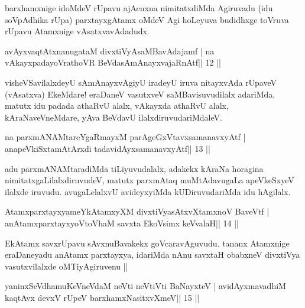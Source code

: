 \begin{artha}
barxhamxnige idoMdeV rUpavu ajAcnxna nimitatxdiMda Agiruvadu (idu
soVpAdhika rUpa) parxtayxgAtamx oMdeV Agi hoLeyuva budidhxge toVruva
rUpavu Atamxnige vAsatxvavAdadudx.
\end{artha}

\begin{shl}
avAyxvaqtAtxnanugataM divxtiVyAsaMBavAdajamf |
na vAkayxpadayoVrathoVR BeVdasAmAnayxvajaRnAtf\hfill || 12 ||
\end{shl}

\begin{artha}
visheVSavilalxdeyU sAmAnayxvAgiyU iradeyU iruva nitayxvAda rUpaveV (vAsatxva) EkeMdare! eraDaneV vasutxveV saMBavisuvudilalx adariMda, matutx idu padada athaRvU alalx, vAkayxda athaRvU alalx, kAraNaveVneMdare, yAva BeVdavU ilalxdiruvudariMdaleV.
\end{artha}

\begin{shl}
na parxmANAMtareYgaRmayxM parAgeGxVtavxsamanavxyAtf |
anapeVkiSxtamAtArxdi tadavidAyxsamanavxyAtf\hfill || 13 ||
\end{shl}

\begin{artha}
adu parxmANAMtaradiMda tiLiyuvudalalx, adakekx kAraNa horagina nimitatxgaLilalxdiruvudeV, matutx parxmAtaq muMtAdavugaLa apeVkeSxyeV ilalxde iruvudu. avugaLelalxvU avideyxyiMda kUDiruvudariMda idu hAgilalx.
\end{artha}



\begin{shl}
AtamxparxtayxyameYkAtamxyXM divxtiVyasAtxvXtamxnoV BaveVtf |
anAtamxparxtayxyoV\s toV\s haM savxta EkoV\s simx keVvalaH\hfill || 14 ||
\end{shl}

\begin{artha}
EkAtamx savxrUpavu sAvxnuBavakekx goVcaravAguvudu. tananx Atamxnige
eraDaneyadu anAtamx parxtayxya, idariMda nAnu savxtaH obabxneV
divxtiVya vasutxvilalxde oMTiyAgiruvenu || 
\end{artha}



\begin{shl}
yaninxSeVdhamuKeVneVdaM neVti neVtiVti BaNayxteV |
avidAyxmavadhiM kaqtAvx devxV rUpeV barxhamxNasitxvXmeV\hfill || 15 ||
\end{shl}

